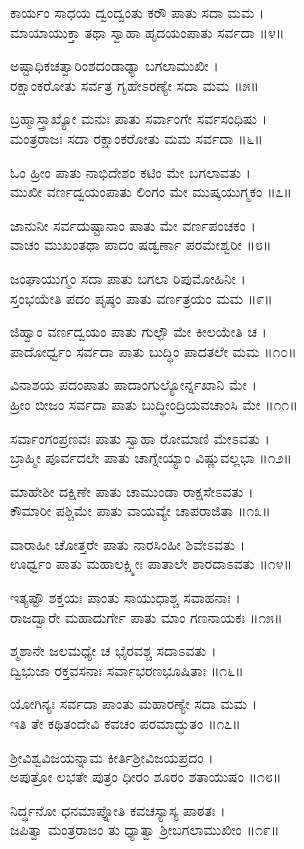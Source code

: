 ಕಾರ್ಯಂ ಸಾಧಯ ದ್ವಂದ್ವಂತು ಕರೌ ಪಾತು ಸದಾ ಮಮ ।\\
ಮಾಯಾಯುಕ್ತಾ ತಥಾ ಸ್ವಾಹಾ ಹೃದಯಂಪಾತು ಸರ್ವದಾ ॥೪॥

ಅಷ್ಟಾಧಿಕಚತ್ವಾರಿಂಶದಂಡಾಢ್ಯಾ ಬಗಲಾಮುಖೀ ।\\
ರಕ್ಷಾಂಕರೋತು ಸರ್ವತ್ರ ಗೃಹೇಽರಣ್ಯೇ ಸದಾ ಮಮ ॥೫॥

ಬ್ರಹ್ಮಾಸ್ತ್ರಾಖ್ಯೋ ಮನುಃ ಪಾತು ಸರ್ವಾಂಗೇ ಸರ್ವಸಂಧಿಷು ।\\
ಮಂತ್ರರಾಜಃ ಸದಾ ರಕ್ಷಾಂಕರೋತು ಮಮ ಸರ್ವದಾ ॥೬॥

ಓಂ ಹ್ರೀಂ ಪಾತು ನಾಭಿದೇಶಂ ಕಟಿಂ ಮೇ ಬಗಲಾವತು ।\\
ಮುಖೀ ವರ್ಣದ್ವಯಂಪಾತು ಲಿಂಗಂ ಮೇ ಮುಷ್ಕಯುಗ್ಮಕಂ ॥೭॥

ಜಾನುನೀ ಸರ್ವದುಷ್ಟಾನಾಂ ಪಾತು ಮೇ ವರ್ಣಪಂಚಕಂ ।\\
ವಾಚಂ ಮುಖಂತಥಾ ಪಾದಂ ಷಡ್ವರ್ಣಾ ಪರಮೇಶ್ವರೀ ॥೮॥

ಜಂಘಾಯುಗ್ಮಂ ಸದಾ ಪಾತು ಬಗಲಾ ರಿಪುಮೋಹಿನೀ ।\\
ಸ್ತಂಭಯೇತಿ ಪದಂ ಪೃಷ್ಠಂ ಪಾತು ವರ್ಣತ್ರಯಂ ಮಮ ॥೯॥

ಜಿಹ್ವಾಂ ವರ್ಣದ್ವಯಂ ಪಾತು ಗುಲ್ಫೌ ಮೇ ಕೀಲಯೇತಿ ಚ ।\\
ಪಾದೋರ್ಧ್ವಂ ಸರ್ವದಾ ಪಾತು ಬುದ್ಧಿಂ ಪಾದತಲೇ ಮಮ ॥೧೦॥

ವಿನಾಶಯ ಪದಂಪಾತು ಪಾದಾಂಗುಲ್ಯೋರ್ನ್ನಖಾನಿ ಮೇ ।\\
ಹ್ರೀಂ ಬೀಜಂ ಸರ್ವದಾ ಪಾತು ಬುದ್ಧೀಂದ್ರಿಯವಚಾಂಸಿ ಮೇ ॥೧೧॥

ಸರ್ವಾಂಗಂಪ್ರಣವಃ ಪಾತು ಸ್ವಾಹಾ ರೋಮಾಣಿ ಮೇಽವತು ।\\
ಬ್ರಾಹ್ಮೀ ಪೂರ್ವದಲೇ ಪಾತು ಚಾಗ್ನೇಯ್ಯಾಂ ವಿಷ್ಣುವಲ್ಲಭಾ ॥೧೨॥

ಮಾಹೇಶೀ ದಕ್ಷಿಣೇ ಪಾತು ಚಾಮುಂಡಾ ರಾಕ್ಷಸೇಽವತು ।\\
ಕೌಮಾರೀ ಪಶ್ಚಿಮೇ ಪಾತು ವಾಯವ್ಯೇ ಚಾಪರಾಜಿತಾ ॥೧೩॥

ವಾರಾಹೀ ಚೋತ್ತರೇ ಪಾತು ನಾರಸಿಂಹೀ ಶಿವೇಽವತು ।\\
ಊರ್ಧ್ವಂ ಪಾತು ಮಹಾಲಕ್ಷ್ಮೀಃ ಪಾತಾಲೇ ಶಾರದಾಽವತು ॥೧೪॥

ಇತ್ಯಷ್ಟೌ ಶಕ್ತಯಃ ಪಾಂತು ಸಾಯುಧಾಶ್ಚ ಸವಾಹನಾಃ ।\\
ರಾಜದ್ವಾರೇ ಮಹಾದುರ್ಗೇ ಪಾತು ಮಾಂ ಗಣನಾಯಕಃ ॥೧೫॥

ಶ್ಮಶಾನೇ ಜಲಮಧ್ಯೇ ಚ ಭೈರವಶ್ಚ ಸದಾಽವತು ।\\
ದ್ವಿಭುಜಾ ರಕ್ತವಸನಾಃ ಸರ್ವಾಭರಣಭೂಷಿತಾಃ ॥೧೬॥

ಯೋಗಿನ್ಯಃ ಸರ್ವದಾ ಪಾಂತು ಮಹಾರಣ್ಯೇ ಸದಾ ಮಮ ।\\
ಇತಿ ತೇ ಕಥಿತಂದೇವಿ ಕವಚಂ ಪರಮಾದ್ಭುತಂ ॥೧೭॥

ಶ್ರೀವಿಶ್ವವಿಜಯನ್ನಾಮ ಕೀರ್ತಿಶ್ರೀವಿಜಯಪ್ರದಂ ।\\
ಅಪುತ್ರೋ ಲಭತೇ ಪುತ್ರಂ ಧೀರಂ ಶೂರಂ ಶತಾಯುಷಂ ॥೧೮॥

ನಿರ್ದ್ಧನೋ ಧನಮಾಪ್ನೋತಿ ಕವಚಸ್ಯಾಸ್ಯ ಪಾಠತಃ ।\\
ಜಪಿತ್ವಾ ಮಂತ್ರರಾಜಂ ತು ಧ್ಯಾತ್ವಾ ಶ್ರೀಬಗಲಾಮುಖೀಂ ॥೧೯॥

